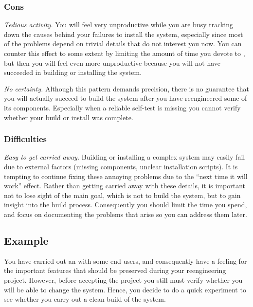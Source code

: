 \documentclass[a4paper,10pt,twoside]{book}
\begin{document}
\subsubsection*{Cons}

\begin{bulletlist}
  \item \emph{Tedious activity.}
You will feel very unproductive while you are busy tracking down the causes behind your failures to install the system, especially since most of the problems depend on trivial details that do not interest you now. You can counter this effect to some extent by limiting the amount of time you devote to , but then you will feel even more unproductive because you will not have succeeded in building or installing the system.

  \item \emph{No certainty.}
Although this pattern demands precision, there is no guarantee that you will actually succeed to build the system after you have reengineered some of its components. Especially when a reliable self-test is missing you cannot verify whether your build or install was complete.
\end{bulletlist}

\subsubsection*{Difficulties}

\begin{bulletlist}
  \item \emph{Easy to get carried away.}
Building or installing a complex system may easily fail due to external factors (missing components, unclear installation scripts). It is tempting to continue fixing these annoying problems due to the ``next time it will work'' effect. Rather than getting carried away with these details, it is important not to lose sight of the main goal, which is not to build the system, but to gain insight into the build process. Consequently you should limit the time you spend, and focus on documenting the problems that arise so you can address them later.
\end{bulletlist}

\subsection*{Example}

You have carried out an  with some end users, and consequently have a feeling for the important features that should be preserved during your reengineering project. However, before accepting the project you still must verify whether you will be able to change the system. Hence, you decide to do a quick experiment to see whether you carry out a clean build of the system.
\end{document}
